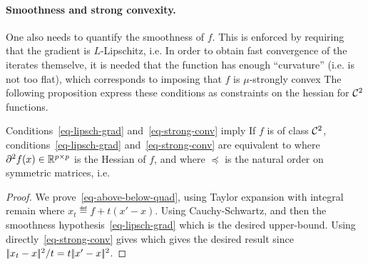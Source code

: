 \paragraph{Smoothness and strong convexity.}

One also needs to quantify the smoothness of $f$. This is enforced by requiring that the gradient is $L$-Lipschitz, i.e.
In order to obtain fast convergence of the iterates themselve, it is needed that the function has enough ``curvature'' (i.e. is not too flat), which corresponds to imposing that $f$ is $\mu$-strongly convex
The following proposition express these conditions as constraints on the hessian for $\mathcal{C}^2$ functions.

\begin{prop}\label{prop-smooth-strong}
Conditions~\eqref{eq-lipsch-grad} and~\eqref{eq-strong-conv} imply
If $f$ is of class $\mathcal{C}^2$, conditions~\eqref{eq-lipsch-grad} and~\eqref{eq-strong-conv} are equivalent to
where $\partial^2 f(x) \in \mathbb{R}^{p \times p}$ is the Hessian of $f$, and 
where $\preceq$ is the natural order on symmetric matrices, i.e.
\end{prop}

\begin{proof}
	We prove~\eqref{eq-above-below-quad}, using Taylor expansion with integral remain
	where $x_t \eqdef f+t(x'-x)$.
	Using Cauchy-Schwartz, and then the smoothness hypothesis~\eqref{eq-lipsch-grad}
	which is the desired upper-bound. Using directly~\eqref{eq-strong-conv} gives 
	which gives the desired result since $|\!| x_t-x |\!|^2 / t = t |\!| x'-x |\!|^2$.
\end{proof}

